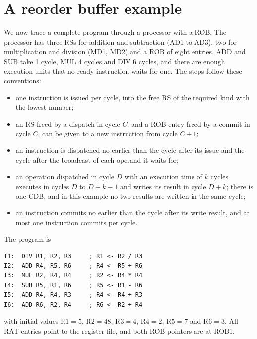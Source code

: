 \documentclass[../main.tex]{subfiles}
\begin{document}
\section{A reorder buffer example}
\label{sec:l08-example}

We now trace a complete program through a processor with a
ROB.  The processor has three
RSs for addition and subtraction (AD1 to AD3), two for multiplication and
division (MD1, MD2) and a ROB of eight entries.  ADD and SUB take 1 cycle, MUL
4 cycles and DIV 6 cycles, and there are enough execution units that no ready
instruction waits for one.  The steps follow these conventions:
\begin{itemize}
  \item one instruction is issued per cycle, into the free RS of the required
    kind with the lowest number;
  \item an RS freed by a dispatch in cycle $C$, and a ROB entry freed by a
    commit in cycle $C$, can be given to a new instruction from cycle $C+1$;
  \item an instruction is dispatched no earlier than the cycle after its issue
    and the cycle after the broadcast of each operand it waits for;
  \item an operation dispatched in cycle $D$ with an execution time of $k$
    cycles executes in cycles $D$ to $D+k-1$ and writes its result in cycle
    $D+k$; there is one CDB, and in this example no two results are written
    in the same cycle;
  \item an instruction commits no earlier than the cycle after its write
    result, and at most one instruction commits per cycle.
\end{itemize}

\begin{example}
  \label{ex:l08-trace}
  The program is
  \begin{lstlisting}[language={[x86masm]Assembler}, numbers=none]
I1:  DIV R1, R2, R3     ; R1 <- R2 / R3
I2:  ADD R4, R5, R6     ; R4 <- R5 + R6
I3:  MUL R2, R4, R4     ; R2 <- R4 * R4
I4:  SUB R5, R1, R6     ; R5 <- R1 - R6
I5:  ADD R4, R4, R3     ; R4 <- R4 + R3
I6:  ADD R6, R2, R4     ; R6 <- R2 + R4
\end{lstlisting}
  with initial values $\text{R1}=5$, $\text{R2}=48$, $\text{R3}=4$,
  $\text{R4}=2$, $\text{R5}=7$ and $\text{R6}=3$.  All RAT entries point to
  the register file, and both ROB pointers are at ROB1.
\end{example}
\end{document}
